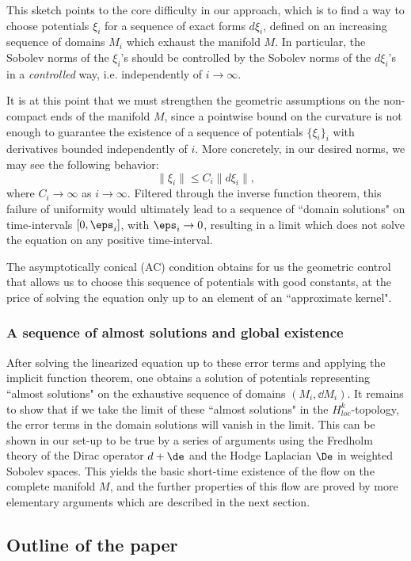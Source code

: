 \documentclass[hidelinks, 12pt, oneside, reqno]{amsart}
\begin{document}
This sketch points to the core difficulty in our approach, which is to find a way to choose potentials $\xi_i$ for a sequence of exact forms $d \xi_i$, defined on an increasing sequence of domains $M_i$ which exhaust the manifold $M$. In particular, the Sobolev norms of the $\xi_i$'s should be controlled by the Sobolev norms of the $d\xi_i$'s in a \textit{controlled} way, i.e. independently of $i \rightarrow \infty$.

It is at this point that we must strengthen the geometric assumptions on the non-compact ends of the manifold $M$, since a pointwise bound on the curvature is not enough to guarantee the existence of a sequence of potentials $\{\xi_i\}_i$ with derivatives bounded independently of $i$. More concretely, in our desired norms, we may see the following behavior:
\[
\|\xi_i\| \le C_i \|d \xi_i\|, 
\]
where $C_i \rightarrow \infty$ as $i \rightarrow \infty$. Filtered through the inverse function theorem, this failure of uniformity would ultimately lead to a sequence of ``domain solutions" on time-intervals $[0, \eps_i]$, with $\eps_i \rightarrow 0$, resulting in a limit which does not solve the equation on any positive time-interval.

The asymptotically conical (AC) condition obtains for us the geometric control that allows us to choose this sequence of potentials with good constants, at the price of solving the equation only up to an element of an ``approximate kernel".

\subsubsection{A sequence of almost solutions and global existence}
After solving the linearized equation up to these error terms and applying the implicit function theorem, one obtains a solution of potentials representing ``almost solutions" on the exhaustive sequence of domains $(M_i, \dd M_i)$. It remains to show that if we take the limit of these ``almost solutions" in the $H^k_{loc}$-topology, the error terms in the domain solutions will vanish in the limit. This can be shown in our set-up to be true by a series of arguments using the Fredholm theory of the Dirac operator $d + \de$ and the Hodge Laplacian $\De$ in weighted Sobolev spaces. This yields the basic short-time existence of the flow on the complete manifold $M$, and the further properties of this flow are proved by more elementary arguments which are described in the next section.

\subsection{Outline of the paper}
\end{document}
